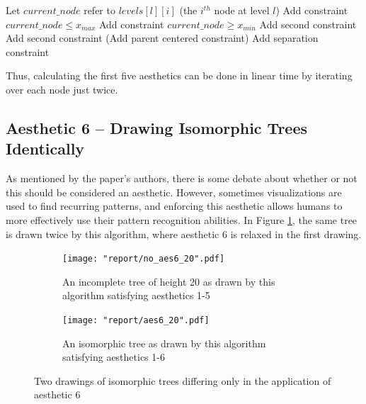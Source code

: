 \documentclass[11pt]{report}
\begin{document}
\begin{algorithm}[H]
    \caption{Tree Layout -- Calculating Aesthetics 1-5}
    \begin{algorithmic}[1]
             
            \State Let $current\_node$ refer to $levels[l][i]$ (the $i^{th}$ node at level $l$)
            \State Add constraint $current\_node \leq x_{max}$ 
            \State Add constraint $current\_node \geq x_{min}$
                \State Add second constraint
            \EndIf
                \State Add second constraint
            \EndIf
                \State (Add parent centered constraint)
            \EndIf
                \State Add separation constraint
            \EndIf
            \EndFor
        \EndFor
        \EndProcedure
    \end{algorithmic}
\end{algorithm}

Thus, calculating the first five aesthetics can be done in linear time by iterating over each node just twice.

\subsection{Aesthetic 6 -- Drawing Isomorphic Trees Identically}
As mentioned by the paper's authors, there is some debate about whether or not this should be considered an aesthetic. However, sometimes visualizations are used to find recurring patterns, and enforcing this aesthetic allows humans to more effectively use their pattern recognition abilities. In Figure \ref{fig:aes6_on_off}, the same tree is drawn twice by this algorithm, where aesthetic 6 is relaxed in the first drawing.

\begin{figure}[H]
    \begin{subfigure}{\linewidth}
        \centering
        \texttt{[image: "report/no\_aes6\_20".pdf]}
        \caption{An incomplete tree of height 20 as drawn by this algorithm satisfying aesthetics 1-5}
    \end{subfigure}
    
    \begin{subfigure}{\linewidth}
    \centering
    \texttt{[image: "report/aes6\_20".pdf]}
    \caption{An isomorphic tree as drawn by this algorithm satisfying aesthetics 1-6}
    \end{subfigure}
    \caption{Two drawings of isomorphic trees differing only in the application of aesthetic 6}
    
    \label{fig:aes6_on_off}
\end{figure}
\end{document}
